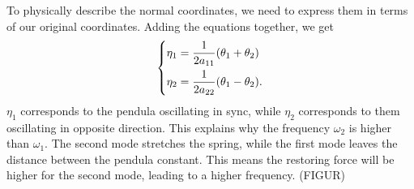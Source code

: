\documentclass{article}
\begin{document}
    To physically describe the normal coordinates, we need to express them in terms of our original coordinates. Adding the equations together, we get
    \begin{equation*}
        \begin{dcases}
            \eta_1 = \frac{1}{2a_{11}}(\theta_1 + \theta_2) \\
            \eta_2 = \frac{1}{2a_{22}}(\theta_1 - \theta_2).
        \end{dcases}
    \end{equation*}
    $\eta_1$ corresponds to the pendula oscillating in sync, while $\eta_2$ corresponds to them oscillating in opposite direction. This explains why the frequency $\omega_2$ is higher than $\omega_1$. The second mode stretches the spring, while the first mode leaves the distance between the pendula constant. This means the restoring force will be higher for the second mode, leading to a higher frequency. (FIGUR)
\end{document}
